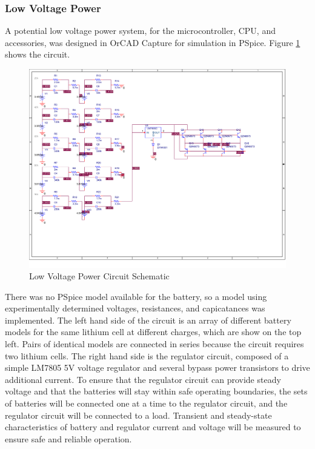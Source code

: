 \documentclass[letterpaper,12pt]{article}
\begin{document}
\subsubsection{Low Voltage Power}\label{power-lv-sec}
A potential low voltage power system, for the microcontroller, CPU, and accessories, was designed in OrCAD Capture for simulation in PSpice. Figure \ref{power-lv} shows the circuit. 
\begin{figure}[!htbp]\centering
  \includegraphics[width=\linewidth]{power.pdf}
  \caption{Low Voltage Power Circuit Schematic}
  \label{power-lv}
\end{figure}
There was no PSpice model available for the battery, so a model using experimentally determined voltages, resistances, and capicatances was implemented. The left hand side of the circuit is an array of different battery models for the same lithium cell at different charges, which are show on the top left. Pairs of identical models are connected in series because the circuit requires two lithium cells. The right hand side is the regulator circuit, composed of a simple LM7805 5V voltage regulator and several bypass power transistors to drive additional current. To ensure that the regulator circuit can provide steady voltage and that the batteries will stay within safe operating boundaries, the sets of batteries will be connected one at a time to the regulator circuit, and the regulator circuit will be connected to a load. Transient and steady-state characteristics of battery and regulator current and voltage will be measured to ensure safe and reliable operation.
\end{document}

